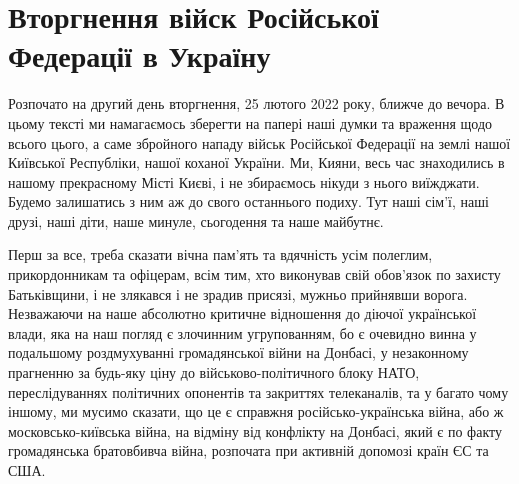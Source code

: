  
 
 
 
 
\section{Вторгнення війск Російської Федерації в Україну}

Розпочато на другий день вторгнення, 25 лютого 2022 року, ближче до вечора. В
цьому тексті ми намагаємось зберегти на папері наші думки та враження щодо
всього цього, а саме збройного нападу військ Російської Федерації на землі
нашої Київської Республіки, нашої коханої України. Ми, Кияни, весь час
знаходились в нашому прекрасному Місті Києві, і не збираємось нікуди з нього
виїжджати. Будемо залишатись з ним аж до свого останнього подиху. Тут наші
сім'ї, наші друзі, наші діти, наше минуле, сьогодення та наше майбутнє. 

Перш за все, треба сказати вічна пам'ять та вдячність усім полеглим,
прикордонникам та офіцерам, всім тим, хто виконував свій обов'язок по захисту
Батьківщини, і не злякався і не зрадив присязі, мужньо прийнявши ворога.
Незважаючи на наше абсолютно критичне відношення до діючої української влади,
яка на наш погляд є злочинним угрупованням, бо є очевидно винна у подальшому
роздмухуванні громадянської війни на Донбасі, у незаконному прагненню за
будь-яку ціну до військово-політичного блоку НАТО, переслідуваннях політичних
опонентів та закриттях телеканалів, та у багато чому іншому, ми мусимо сказати,
що це є справжня російсько-українська війна, або ж московсько-київська війна,
на відміну від конфлікту на Донбасі, який є по факту громадянська братовбивча
війна, розпочата при активній допомозі країн ЄС та США. 

